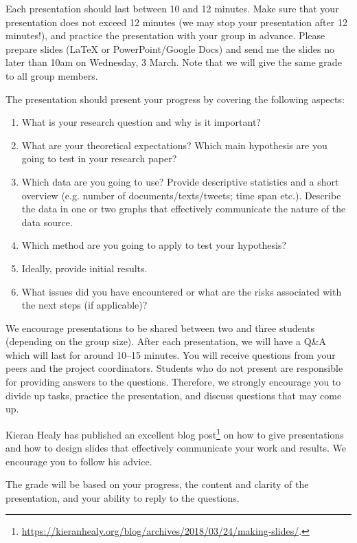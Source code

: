 \documentclass[abstract=on,parskip=full,headings=standardclasses,fontsize=11pt,paper=a4]{scrartcl}
\begin{document}
Each presentation should last between 10 and 12 minutes. Make sure that your presentation does not exceed 12 minutes (we may stop your presentation after 12 minutes!), and practice the presentation with your group in advance.  Please prepare slides (LaTeX or PowerPoint/Google Docs) and send me the slides no later than 10am on Wednesday, 3 March. Note that we will give the same grade to all group members.

The presentation should present your progress by covering the following aspects:

\begin{enumerate}
\item What is your research question and why is it important?
\item What are your theoretical expectations? Which main hypothesis are you going to test in your research paper?
\item Which data are you going to use? Provide descriptive statistics and a short overview (e.g. number of documents/texts/tweets; time span etc.). Describe the data in one or two graphs that effectively communicate the nature of the data source.
\item Which method are you going to apply to test your hypothesis?
\item Ideally, provide initial results.
\item What issues did you have encountered or what are the risks associated with the next steps (if applicable)? 
\end{enumerate}

We encourage presentations to be shared between two and three students (depending on the group size).  
After each presentation, we will have a Q\&A which will last for around 10--15 minutes. You will receive questions from your peers and the project coordinators. Students who do not present are responsible for providing answers to the questions. Therefore, we strongly encourage you to divide up tasks, practice the presentation,  and discuss questions that may come up.


Kieran Healy has published an excellent blog post\footnote{\url{https://kieranhealy.org/blog/archives/2018/03/24/making-slides/}.} on how to give  presentations and how to design slides that effectively communicate your work and results. We encourage you to follow his advice.

The grade will be based on your progress, the content and clarity of the presentation, and  your ability to reply to the questions. 
\end{document}
